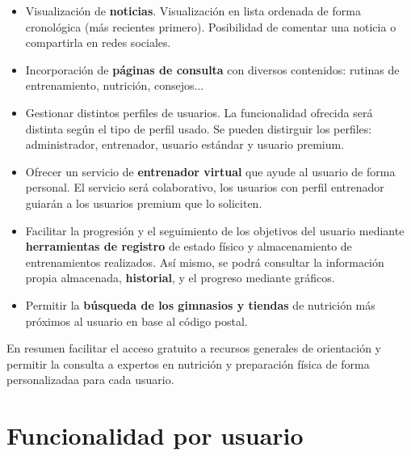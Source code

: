 \documentclass[a4paper]{article}
\begin{document}
\begin{itemize}
	\item	Visualización de \textbf{noticias}. Visualización en lista ordenada de forma cronológica (más recientes primero). Posibilidad de comentar una noticia o compartirla en redes sociales.
	
	\item	Incorporación de \textbf{páginas de consulta} con diversos contenidos: rutinas de entrenamiento, nutrición, consejos...
	
	\item	Gestionar distintos perfiles de usuarios. La funcionalidad ofrecida será distinta según el tipo de perfil usado. Se pueden distirguir los perfiles: administrador, entrenador, usuario estándar y usuario premium.
	
	\item	Ofrecer un servicio de \textbf{entrenador virtual} que ayude al usuario de forma personal. El servicio será colaborativo, los usuarios con perfil entrenador guiarán a los usuarios premium que lo soliciten.
	
	\item	Facilitar la progresión y el seguimiento de los objetivos del usuario mediante \textbf{herramientas de registro} de estado físico y almacenamiento de entrenamientos realizados. Así mismo, se podrá consultar la información propia almacenada, \textbf{historial}, y el progreso mediante gráficos.
	
	\item	Permitir la \textbf{búsqueda de los gimnasios y tiendas} de nutrición más próximos al usuario en base al código postal.
\end{itemize}

En resumen facilitar el acceso gratuito a recursos generales de orientación y permitir la consulta a expertos en nutrición y preparación física de forma personalizadaa para cada usuario.

\section{Funcionalidad por usuario}

\end{document}
